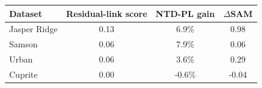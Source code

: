 \begin{tabular}{@{}l c c c@{}}
\toprule
Dataset & Residual-link score & NTD-PL gain & \(\Delta\)SAM \\
\midrule
Jasper Ridge & 0.13 & 6.9\% & 0.98\\
Samson & 0.06 & 7.9\% & 0.06\\
Urban & 0.06 & 3.6\% & 0.29\\
Cuprite & 0.00 & -0.6\% & -0.04\\
\bottomrule
\end{tabular}
